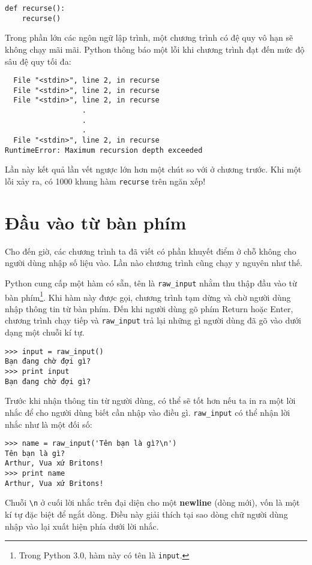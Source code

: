 \documentclass[11pt]{book}
\begin{document}
\beforeverb
\begin{verbatim}
def recurse():
    recurse()
\end{verbatim}
\afterverb
%
Trong phần lớn các ngôn ngữ lập trình, một chương trình có đệ quy vô hạn
sẽ không chạy mãi mãi. Python thông báo một lỗi khi chương trình đạt đến
mức độ sâu đệ quy tối đa:


\beforeverb
\begin{verbatim}
  File "<stdin>", line 2, in recurse
  File "<stdin>", line 2, in recurse
  File "<stdin>", line 2, in recurse
                  .   
                  .
                  .
  File "<stdin>", line 2, in recurse
RuntimeError: Maximum recursion depth exceeded
\end{verbatim}
\afterverb
%
Lần này kết quả lần vết ngược lớn hơn một chút so với ở
chương trước. Khi một lỗi xảy ra, có 1000 khung hàm
{\tt recurse} trên ngăn xếp!


\section{Đầu vào từ bàn phím}

Cho đến giờ, các chương trình ta đã viết có phần khuyết điểm ở chỗ
không cho người dùng nhập số liệu vào. Lần nào chương trình cũng
chạy y nguyên như thế.

Python cung cấp một hàm có sẵn, tên là \verb"raw_input" nhằm 
thu thập đầu vào từ bàn phím\footnote{Trong Python 3.0, hàm này 
có tên là {\tt input}.}.  Khi hàm này được gọi, chương trình tạm dừng
và chờ người dùng nhập thông tin từ bàn phím. Đến khi người dùng 
gõ phím {\sf Return} hoặc {\sf Enter}, chương trình chạy tiếp và
\verb"raw_input" trả lại những gì người dùng đã gõ vào dưới dạng
một chuỗi kí tự.


\beforeverb
\begin{verbatim}
>>> input = raw_input()
Bạn đang chờ đợi gì?
>>> print input
Bạn đang chờ đợi gì?
\end{verbatim}
\afterverb
%
Trước khi nhận thông tin từ người dùng, có thể sẽ tốt hơn nếu ta in ra
một lời nhắc để cho người dùng biết cần nhập vào điều gì. \verb"raw_input" 
có thể nhận lời nhắc như là một đối số:


\beforeverb
\begin{verbatim}
>>> name = raw_input('Tên bạn là gì?\n')
Tên bạn là gì?
Arthur, Vua xứ Britons!
>>> print name
Arthur, Vua xứ Britons!
\end{verbatim}
\afterverb
%
Chuỗi \verb"\n" ở cuối lời nhắc trên đại diện cho một {\bf newline} (dòng mới),
vốn là một kí tự đặc biệt để ngắt dòng. Điều này giải thích tại sao dòng chữ
người dùng nhập vào lại xuất hiện phía dưới lời nhắc.
\end{document}
